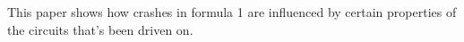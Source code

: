 This paper shows how crashes in formula 1 are influenced by certain properties of the circuits that's been driven on.
